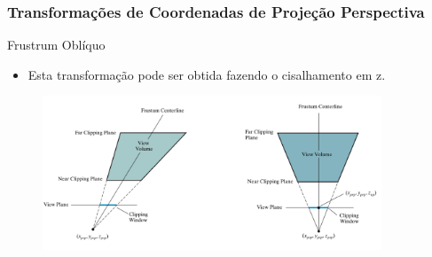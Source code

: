 \documentclass{beamer}
\begin{document}
\begin{frame}
\frametitle{Transformações de Coordenadas de Projeção Perspectiva}
	\begin{block}{Frustrum Oblíquo}
		\begin{itemize}
			\item Esta transformação pode ser obtida fazendo o cisalhamento em z.
		\end{itemize}	
	\end{block}
	
		\begin{figure}[!h]
			\begin{center}
			\includegraphics[width=0.9\textwidth]{Figures/TraFru}
			\end{center}
	\end{figure}
\end{frame}

\end{document}

